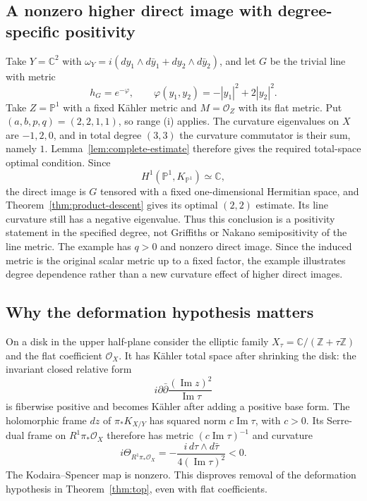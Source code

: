 \documentclass[11pt,reqno]{amsart}
\numberwithin{equation}{section}
\theoremstyle{definition}
\theoremstyle{remark}
\newcommand{\ddbar}{\partial\bar\partial}
\newcommand{\C}{\mathbb C}
\newcommand{\cO}{\mathcal O}
\begin{document}
\subsection{A nonzero higher direct image with degree-specific positivity}
Take $Y=\C^2$ with $\omega_Y=i(dy_1\wedge d\bar y_1+dy_2\wedge d\bar y_2)$, and let $G$ be the trivial line with metric
\[
 h_G=e^{-\varphi},\qquad
 \varphi(y_1,y_2)=-|y_1|^2+2|y_2|^2.
\]
Take $Z=\mathbb P^1$ with a fixed K\"ahler metric and $M=\cO_Z$ with its flat metric. Put $(a,b,p,q)=(2,2,1,1)$, so range (i) applies. The curvature eigenvalues on $X$ are $-1,2,0$, and in total degree $(3,3)$ the curvature commutator is their sum, namely $1$. Lemma~\ref{lem:complete-estimate} therefore gives the required total-space optimal condition. Since
\[
 H^1(\mathbb P^1,K_{\mathbb P^1})\simeq\C,
\]
the direct image is $G$ tensored with a fixed one-dimensional Hermitian space, and Theorem~\ref{thm:product-descent} gives its optimal $(2,2)$ estimate. Its line curvature still has a negative eigenvalue. Thus this conclusion is a positivity statement in the specified degree, not Griffiths or Nakano semipositivity of the line metric. The example has $q>0$ and nonzero direct image. Since the induced metric is the original scalar metric up to a fixed factor, the example illustrates degree dependence rather than a new curvature effect of higher direct images.

\subsection{Why the deformation hypothesis matters}
On a disk in the upper half-plane consider the elliptic family
$X_\tau=\C/(\mathbb Z+\tau\mathbb Z)$ and the flat coefficient $\cO_X$.
It has K\"ahler total space after shrinking the disk: the invariant closed relative form
\[
 i\ddbar\frac{(\operatorname{Im}z)^2}{\operatorname{Im}\tau}
\]
is fiberwise positive and becomes K\"ahler after adding a positive base form. The holomorphic frame $dz$ of $\pi_*K_{X/Y}$ has squared norm $c\operatorname{Im}\tau$, with $c>0$. Its Serre-dual frame on $R^1\pi_*\cO_X$ therefore has metric $(c\operatorname{Im}\tau)^{-1}$ and curvature
\[
 i\Theta_{R^1\pi_*\cO_X}
   =-\frac{i\,d\tau\wedge d\bar\tau}
               {4(\operatorname{Im}\tau)^2}<0.
\]
The Kodaira--Spencer map is nonzero. This disproves removal of the deformation hypothesis in Theorem~\ref{thm:top}, even with flat coefficients.
\end{document}

